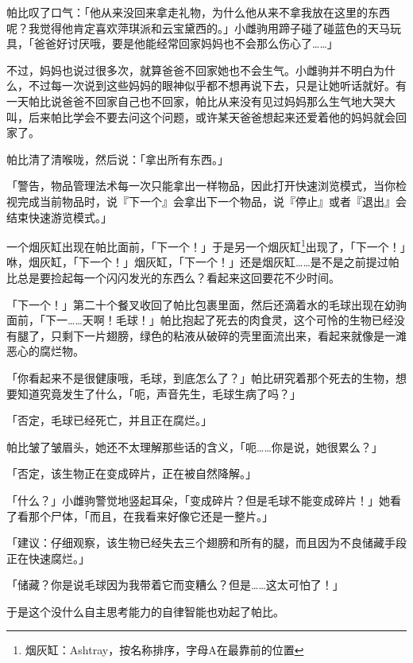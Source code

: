 帕比叹了口气：「他从来没回来拿走礼物，为什么他从来不拿我放在这里的东西呢？我觉得他肯定喜欢萍琪派和云宝黛西的。」小雌驹用蹄子碰了碰蓝色的天马玩具，「爸爸好讨厌哦，要是他能经常回家妈妈也不会那么伤心了……」

不过，妈妈也说过很多次，就算爸爸不回家她也不会生气。小雌驹并不明白为什么，不过每一次说到这些妈妈的眼神似乎都不想再说下去，只是让她听话就好。有一天帕比说爸爸不回家自己也不回家，帕比从来没有见过妈妈那么生气地大哭大叫，后来帕比学会不要去问这个问题，或许某天爸爸想起来还爱着他的妈妈就会回家了。

帕比清了清喉咙，然后说：「拿出所有东西。」

「{\mt 警告，物品管理法术每一次只能拿出一样物品，因此打开快速浏览模式，当你检视完成当前物品时，说『下一个』会拿出下一个物品，说『停止』或者『退出』会结束快速游览模式。}」

一个烟灰缸出现在帕比面前，「下一个！」于是另一个烟灰缸\footnote{烟灰缸：Ashtray，按名称排序，字母A在最靠前的位置}出现了，「下一个！」咻，烟灰缸，「下一个！」烟灰缸，「下一个！」还是烟灰缸……是不是之前提过帕比总是要捡起每一个闪闪发光的东西么？看起来这回要花不少时间。

\horizonline


「下一个！」第二十个餐叉收回了帕比包裹里面，然后还滴着水的毛球出现在幼驹面前，「下一……天啊！毛球！」帕比抱起了死去的肉食灵，这个可怜的生物已经没有腿了，只剩下一片翅膀，绿色的粘液从破碎的壳里面流出来，看起来就像是一滩恶心的腐烂物。

「你看起来不是很健康哦，毛球，到底怎么了？」帕比研究着那个死去的生物，想要知道究竟发生了什么，「呃，声音先生，毛球生病了吗？」

「{\mt 否定，毛球已经死亡，并且正在腐烂。}」

帕比皱了皱眉头，她还不太理解那些话的含义，「呃……你是说，她很累么？」

「{\mt 否定，该生物正在变成碎片，正在被自然降解。}」

「什么？」小雌驹警觉地竖起耳朵，「变成碎片？但是毛球不能变成碎片！」她看了看那个尸体，「而且，在我看来好像它还是一整片。」

「{\mt 建议：仔细观察，该生物已经失去三个翅膀和所有的腿，而且因为不良储藏手段正在快速腐烂。}」

「储藏？你是说毛球因为我带着它而变糟么？但是……这太可怕了！」

于是这个没什么自主思考能力的自律智能也劝起了帕比。

